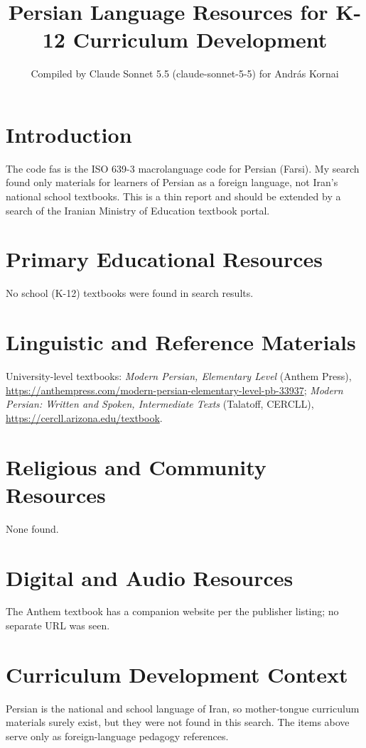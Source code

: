 \documentclass[12pt]{article}
\title{Persian Language Resources for K-12 Curriculum Development}
\author{Compiled by Claude Sonnet 5.5 (claude-sonnet-5-5) for Andr\'as Kornai}
\date{}
\begin{document}
\maketitle
\section{Introduction}
The code fas is the ISO 639-3 macrolanguage code for Persian (Farsi). My search found only materials for learners of Persian as a foreign language, not Iran's national school textbooks. This is a thin report and should be extended by a search of the Iranian Ministry of Education textbook portal.
\section{Primary Educational Resources}
No school (K-12) textbooks were found in search results.
\section{Linguistic and Reference Materials}
University-level textbooks: \emph{Modern Persian, Elementary Level} (Anthem Press), \url{https://anthempress.com/modern-persian-elementary-level-pb-33937}; \emph{Modern Persian: Written and Spoken, Intermediate Texts} (Talatoff, CERCLL), \url{https://cercll.arizona.edu/textbook}.
\section{Religious and Community Resources}
None found.
\section{Digital and Audio Resources}
The Anthem textbook has a companion website per the publisher listing; no separate URL was seen.
\section{Curriculum Development Context}
Persian is the national and school language of Iran, so mother-tongue curriculum materials surely exist, but they were not found in this search. The items above serve only as foreign-language pedagogy references.
\end{document}
